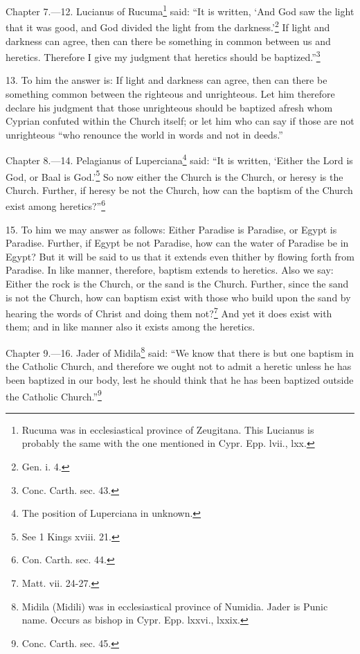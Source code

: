 
Chapter 7.—12. Lucianus of Rucuma\footnote{\par  Rucuma was in ecclesiastical province of Zeugitana. This Lucianus is probably the same with the one mentioned in Cypr. Epp. lvii., lxx.} said: ``It is written, ‘And God saw the light that it was good, and God divided the light from the darkness.’\footnote{\par  Gen. i. 4.} If light and darkness can agree, then can there be something in common between us and heretics. Therefore I give my judgment that heretics should be baptized.''\footnote{\par  Conc. Carth. sec. 43.}

13. To him the answer is: If light and darkness can agree, then can there be something common between the righteous and unrighteous. Let him therefore declare his judgment that those unrighteous should be baptized afresh whom Cyprian confuted within the Church itself; or let him who can say if those are not unrighteous ``who renounce the world in words and not in deeds.''


Chapter 8.—14. Pelagianus of Luperciana\footnote{\par  The position of Luperciana in unknown.} said: ``It is written, ‘Either the Lord is God, or Baal is God.’\footnote{\par  See 1 Kings xviii. 21.} So now either the Church is the Church, or heresy is the Church. Further, if heresy be not the Church, how can the baptism of the Church exist among heretics?''\footnote{\par  Con. Carth. sec. 44.}

15. To him we may answer as follows: Either Paradise is Paradise, or Egypt is Paradise. Further, if Egypt be not Paradise, how can the water of Paradise be in Egypt? But it will be said to us that it extends even thither by flowing forth from Paradise. In like manner, therefore, baptism extends to heretics. Also we say: Either the rock is the Church, or the sand is the Church. Further, since the sand is not the Church, how can baptism exist with those who build upon the sand by hearing the words of Christ and doing them not?\footnote{\par  Matt. vii. 24-27.} And yet it does exist with them; and in like manner also it exists among the heretics.


Chapter 9.—16. Jader of Midila\footnote{\par  Midila (Midili) was in ecclesiastical province of Numidia. Jader is Punic name. Occurs as bishop in Cypr. Epp. lxxvi., lxxix.} said: ``We know that there is but one baptism in the Catholic Church, and therefore we ought not to admit a heretic unless he has been baptized in our body, lest he should think that he has been baptized outside the Catholic Church.''\footnote{\par  Conc. Carth. sec. 45.}

